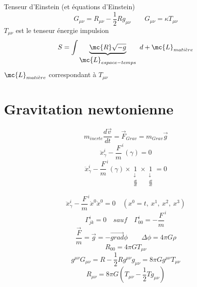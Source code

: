 Tenseur d'Einstein (et équations d'Einstein)
\[
\boxed{ G_{\mu\nu} = R_{\mu\nu}-\frac{1}{2}Rg_{\mu\nu} }
\qquad G_{\mu\nu} = \kappa T_{\mu\nu}
\]
$T_{\mu\nu}$ est le tenseur énergie impulsion
\[
S=\int \underbrace{\mc{R}\sqrt{-g}}_{\displaystyle \mc{L}_{espace-temps}}\ d
 + \mc{L}_{mati\grave{e}re}
\]
$\mc{L}_{mati\grave{e}re}$ correspondant à $T_{\mu\nu}$


\section{Gravitation newtonienne}
\[
m_{inerte}\frac{d\vec{v}}{dt}=\vec{F}_{Grav}=m_{Grav}\vec{g}
\]
\[
\ddot{x}^i_\gamma-\frac{F}{m}^i(\gamma)=0
\]
\[
\ddot{x}^i_\gamma-\frac{F}{m}^i(\gamma)
\times\underset{\substack{\downarrow \\ \frac{dt}{dt}}}{1}
\times\underset{\substack{\downarrow \\ \frac{dt}{dt}}}{1}=0
\]

\[
\ddot{x}^i_\gamma-\frac{F}{m}^i\dot{x}^0\dot{x}^0=0
\quad (x^0=t,\ x^1,\ x^2,\ x^3)
\]
\[
\Gamma^i_{jk} = 0 \quad sauf \quad \Gamma^i_{00}=-\frac{F}{m}^i
\]
\[
\frac{\vec{F}}{m}=\vec{g}=-\vec{grad}\phi
\qquad \Delta\phi=4\pi G\rho
\]
\[
R_{00}=4\pi G T_{\mu\nu}
\]
\[
g^{\mu\nu}G_{\mu\nu}=R-\frac{1}{2}Rg^{\mu\nu}g_{\mu\nu}
 = 8\pi Gg^{\mu\nu}T_{\mu\nu}
\]
\[
R_{\mu\nu}=8\pi G(T_{\mu\nu}-\frac{1}{2}Tg_{\mu\nu})
\]



